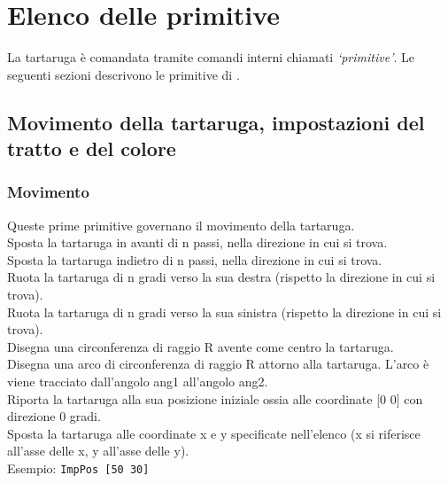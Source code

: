 \chapter{Elenco delle primitive}

\label{liste-prim} La tartaruga è comandata tramite comandi interni chiamati \emph{`primitive'}. Le seguenti sezioni descrivono le primitive di \xlogo.


\section{Movimento della tartaruga, impostazioni del tratto e del colore}
\subsection{Movimento}
Queste prime primitive governano il movimento della tartaruga.\\

 Sposta la tartaruga in avanti di n passi, nella direzione in cui si trova.\\

 Sposta la tartaruga indietro di n passi, nella direzione in cui si trova.\\

 Ruota la tartaruga di n gradi verso la sua destra (rispetto la direzione in cui si trova).\\

 Ruota la tartaruga di n gradi verso la sua sinistra (rispetto la direzione in cui si trova).\\

 Disegna una circonferenza di raggio R avente come centro la tartaruga.\\

 Disegna una arco di circonferenza di raggio R attorno alla tartaruga. L'arco è viene tracciato dall'angolo ang1 all'angolo ang2.\\

 Riporta la tartaruga alla sua posizione iniziale ossia alle coordinate {[}0 0{]} con direzione 0 gradi.\\

 Sposta la tartaruga alle coordinate x e y specificate nell'elenco (x si riferisce all'asse delle x, y all'asse delle y).\\
 Esempio: \texttt{ImpPos [50 30]}\\

